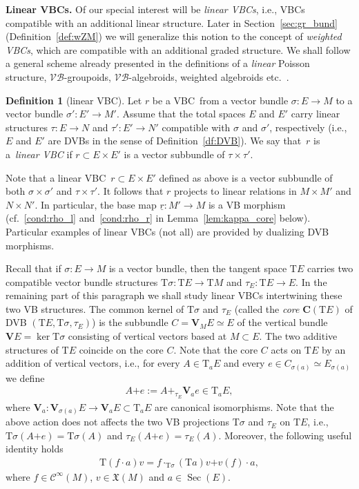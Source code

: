 \documentclass[pdftex]{sigma}
\newcommand{\ZM}{{VBC}} %
\newcommand{\und}{\underline}
\newcommand{\Sec}{\operatorname{Sec}}
\newcommand{\V}{\mathbf{V}} %
\newcommand{\ra}{\rightarrow}
\newcommand{\plus}{\boldsymbol{\pmb{+}}}
\newcommand{\T}{\mathrm{T}} %
\newcommand{\Core}{\mathbf{C}}
\newcommand{\VB}{\mathcal{VB}} %
\newcommand{\Cf}{\mathcal{C}^\infty}
\newcommand{\VF}{\mathfrak{X}}
\numberwithin{equation}{section}
\theoremstyle{definition}
\newtheorem{df}[thm]{Definition}
\begin{document}
{\bf Linear \ZM s.} Of our special interest will be \emph{linear \ZM s}, i.e., \ZM s compatible with an additional linear structure. Later in Section~\ref{sec:gr_bund} (Definition~\ref{def:wZM}) we will generalize this notion to the concept of \emph{weighted \ZM s}, which are compatible with an additional graded structure. We shall follow a general scheme already presented in the definitions of a \emph{linear} Poisson structure, $\VB$-groupoids, $\VB$-algebroids, weighted algebroids etc.~\cite{BGG, Mackenzie_lie_2005}.

\begin{df}[linear \ZM ] \label{def:linear_ZM} Let $r$ be a \ZM\ from a vector bundle $\sigma\colon E\ra M$ to a vector bundle $ \sigma'\colon E'\ra M'$. Assume that the total spaces $E$ and $E'$ carry linear structures $\tau\colon E\ra N$ and $\tau'\colon E'\ra N'$ compatible with $\sigma$ and $\sigma'$, respectively (i.e., $E$ and $E'$ are DVBs in the sense of Definition~\ref{df:DVB}). We say that~$r$ is a~\emph{linear \ZM } if $r\subset E\times E'$ is a vector subbundle of $\tau\times\tau'$.
 \end{df}

Note that a linear \ZM\ $r\subset E\times E'$ defined as above is a vector subbundle of both $\sigma\times \sigma'$ and $\tau\times\tau '$. It follows that $r$ projects to linear relations in $M\times M'$ and $N\times N'$. In particular, the base map $\und{r}\colon M'\ra M$ is a VB morphism (cf.~\eqref{cond:rho_l} and~\eqref{cond:rho_r} in Lemma~\ref{lem:kappa_core} below). Particular examples of linear \ZM s (not all) are provided by dualizing DVB morphisms.

Recall that if $\sigma\colon E\ra M$ is a vector bundle, then the tangent space $\T E$ carries two compatible vector bundle structures $\T\sigma\colon \T E\ra\T M$ and $\tau_E\colon \T E\ra E$. In the remaining part of this paragraph we shall study linear \ZM s intertwining these two VB structures. The common kernel of  $\T \sigma$ and $\tau _E$ (called the \emph{core} $\Core(\T E)$ of DVB $(\T E, \T \sigma, \tau_E)$) is the
subbundle  $C=\V_M E \simeq E$ of the vertical bundle $\V E = \ker \T \sigma$ consisting of vertical vectors based at $M\subset E$. The two additive structures of $\T E$ coincide on the core $C$. Note that the core $C$  acts on $\T E$ by an addition of vertical vectors, i.e., for every $A\in \T_a E$ and every $e\in C_{\sigma(a)}\simeq E_{\sigma(a)}$ we define
\begin{gather*} A\plus e:=A+_{\tau_E}\V_a e\in \T_a E,\end{gather*}
where $\V_a\colon \V_{\sigma(a)} E \rightarrow \V_a E \subset \T_a E$ are canonical isomorphisms.
Note that the above action does not affects the two VB projections $\T\sigma$ and $\tau_E$ on $\T E$, i.e., $\T\sigma(A\plus e)=\T\sigma(A)$ and $\tau_E(A\plus e)=\tau_E(A)$. Moreover, the following useful identity holds
\begin{gather}\label{eqn:T_fa}
\T(f\cdot a) v = f\cdot_{\T\sigma} (\T a) v \plus v(f)\cdot a,
\end{gather}
where $f\in \Cf(M)$, $v\in \VF(M)$ and $a\in\Sec(E)$.
\end{document}

